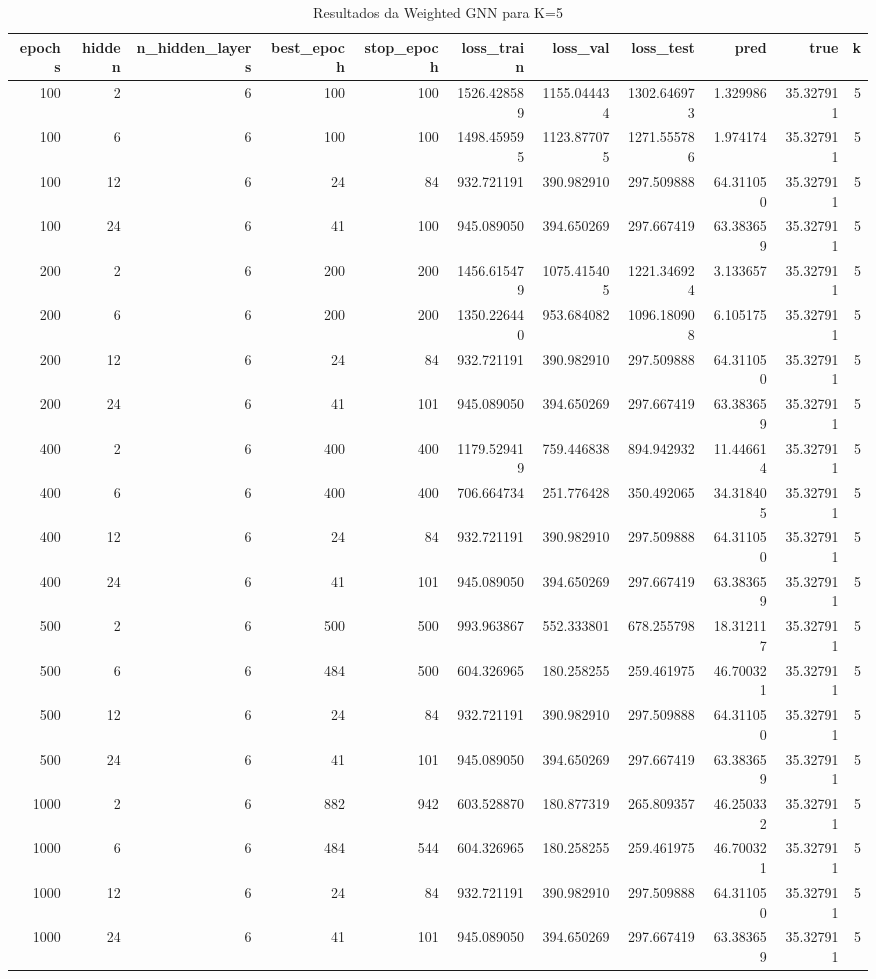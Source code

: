 \begin{table}
\caption{Resultados da Weighted GNN para K=5}
\label{tab:weighted_gnn_results_k5}
\begin{tabular}{rrrrrrrrrrr}
\toprule
epochs & hidden & n\_hidden\_layers & best\_epoch & stop\_epoch & loss\_train & loss\_val & loss\_test & pred & true & k \\
\midrule
100 & 2 & 6 & 100 & 100 & 1526.428589 & 1155.044434 & 1302.646973 & 1.329986 & 35.327911 & 5 \\
100 & 6 & 6 & 100 & 100 & 1498.459595 & 1123.877075 & 1271.555786 & 1.974174 & 35.327911 & 5 \\
100 & 12 & 6 & 24 & 84 & 932.721191 & 390.982910 & 297.509888 & 64.311050 & 35.327911 & 5 \\
100 & 24 & 6 & 41 & 100 & 945.089050 & 394.650269 & 297.667419 & 63.383659 & 35.327911 & 5 \\
200 & 2 & 6 & 200 & 200 & 1456.615479 & 1075.415405 & 1221.346924 & 3.133657 & 35.327911 & 5 \\
200 & 6 & 6 & 200 & 200 & 1350.226440 & 953.684082 & 1096.180908 & 6.105175 & 35.327911 & 5 \\
200 & 12 & 6 & 24 & 84 & 932.721191 & 390.982910 & 297.509888 & 64.311050 & 35.327911 & 5 \\
200 & 24 & 6 & 41 & 101 & 945.089050 & 394.650269 & 297.667419 & 63.383659 & 35.327911 & 5 \\
400 & 2 & 6 & 400 & 400 & 1179.529419 & 759.446838 & 894.942932 & 11.446614 & 35.327911 & 5 \\
400 & 6 & 6 & 400 & 400 & 706.664734 & 251.776428 & 350.492065 & 34.318405 & 35.327911 & 5 \\
400 & 12 & 6 & 24 & 84 & 932.721191 & 390.982910 & 297.509888 & 64.311050 & 35.327911 & 5 \\
400 & 24 & 6 & 41 & 101 & 945.089050 & 394.650269 & 297.667419 & 63.383659 & 35.327911 & 5 \\
500 & 2 & 6 & 500 & 500 & 993.963867 & 552.333801 & 678.255798 & 18.312117 & 35.327911 & 5 \\
500 & 6 & 6 & 484 & 500 & 604.326965 & 180.258255 & 259.461975 & 46.700321 & 35.327911 & 5 \\
500 & 12 & 6 & 24 & 84 & 932.721191 & 390.982910 & 297.509888 & 64.311050 & 35.327911 & 5 \\
500 & 24 & 6 & 41 & 101 & 945.089050 & 394.650269 & 297.667419 & 63.383659 & 35.327911 & 5 \\
1000 & 2 & 6 & 882 & 942 & 603.528870 & 180.877319 & 265.809357 & 46.250332 & 35.327911 & 5 \\
1000 & 6 & 6 & 484 & 544 & 604.326965 & 180.258255 & 259.461975 & 46.700321 & 35.327911 & 5 \\
1000 & 12 & 6 & 24 & 84 & 932.721191 & 390.982910 & 297.509888 & 64.311050 & 35.327911 & 5 \\
1000 & 24 & 6 & 41 & 101 & 945.089050 & 394.650269 & 297.667419 & 63.383659 & 35.327911 & 5 \\
\bottomrule
\end{tabular}
\end{table}
